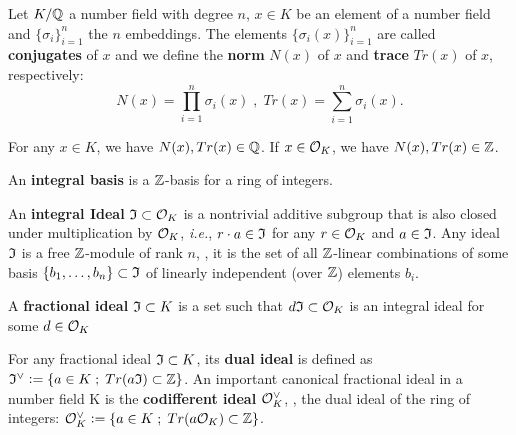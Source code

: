 \documentclass[a4paper,12pt]{article}
\begin{document}
\begin{definition}\label{definition:trace-and-norm}
  Let $K/\mathbb{Q}$ a number field with degree $n$, $x \in K$ be an element of a number field and $\{\sigma_i\}_{i=1}^n$ the $n$ embeddings. The elements $\{\sigma_i(x)\}_{i=1}^n$ are called \textbf{conjugates} of
  $x$ and we define the \textbf{norm} $N(x)$ of $x$  and \textbf{trace} $Tr(x)$ of $x$,
  respectively:
  \[
    N(x) = \prod_{i=1}^n{\sigma_i(x)} \;,\;   Tr(x) = \sum_{i=1}^n{\sigma_i(x)}.
  \]

\end{definition}

\begin{theorem}
  For any $x \in K$, we have $N(x), Tr(x) \in \mathbb{Q}$. If $x \in \mathcal{O}_K$, we have $N(x),
  Tr(x) \in \mathbb{Z}$.
\end{theorem}

\begin{definition}
An \textbf{integral basis} is a $\mathbb{Z}$-basis for a ring of integers. 
\end{definition}

\begin{definition}
  An \textbf{integral Ideal} $\mathfrak{I} \subset \mathcal{O}_K$ is a  nontrivial additive subgroup that
  is also closed under multiplication by $\mathcal{O}_K$, \textit{i.e.}, $r \cdot a \in \mathfrak{I}$ for
  any $r \in \mathcal{O}_K$ and $a \in \mathfrak{I}$. Any ideal $\mathfrak{I}$ is a free $\mathbb{Z}$-module of rank
  $n$, \ie, it is the set of all $\mathbb{Z}$-linear combinations of some basis
  $\{b_1,\dots,b_n\} \subset \mathfrak{I}$  of linearly independent (over $\mathbb{Z}$) elements $b_i$.
\end{definition}

\begin{definition}
  A \textbf{fractional ideal} $\mathfrak{I} \subset K$ is a set such that $d\mathfrak{I} \subset \mathcal{O}_K$ is an
  integral ideal for some $d \in \mathcal{O}_K$
\end{definition}

\begin{definition}
  For any fractional ideal $\mathfrak{I} \subset K$, its \textbf{dual ideal} is defined as
  $\mathfrak{I}^\vee \vcentcolon = \{ a \in K \;;\; Tr(a\mathfrak{I}) \subset \mathbb{Z} \}$. An important canonical
  fractional ideal in a number field K is the \textbf{codifferent ideal}
  $\mathcal{O}_K^\vee$, \ie, the dual ideal of the ring of integers:
  $\mathcal{O}_K^\vee \vcentcolon = \{ a \in K \;;\; Tr(a \mathcal{O}_K) \subset \mathbb{Z} \}$.
\end{definition}
\end{document}

